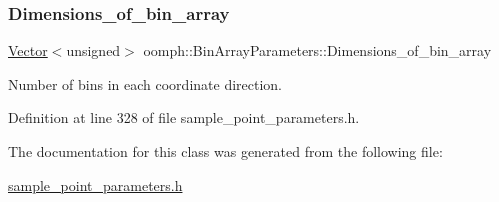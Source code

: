 \subsubsection{\texorpdfstring{Dimensions\+\_\+of\+\_\+bin\+\_\+array}{Dimensions\_of\_bin\_array}}
{\footnotesize\ttfamily \hyperlink{classoomph_1_1Vector}{Vector}$<$unsigned$>$ oomph\+::\+Bin\+Array\+Parameters\+::\+Dimensions\+\_\+of\+\_\+bin\+\_\+array\hspace{0.3cm}{\ttfamily [protected]}}



Number of bins in each coordinate direction. 



Definition at line 328 of file sample\+\_\+point\+\_\+parameters.\+h.



The documentation for this class was generated from the following file\+:\begin{DoxyCompactItemize}
\item 
\hyperlink{sample__point__parameters_8h}{sample\+\_\+point\+\_\+parameters.\+h}\end{DoxyCompactItemize}
